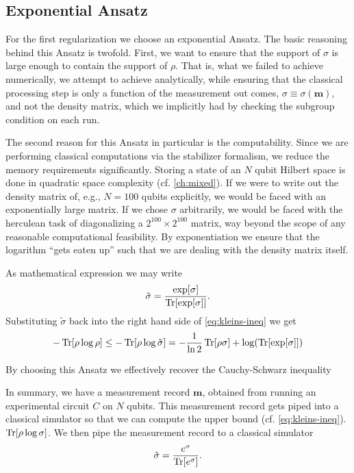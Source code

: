 \subsection{Exponential Ansatz}
For the first regularization we choose an exponential Ansatz. The basic reasoning
behind this Ansatz is twofold. First, we want to ensure that the support of
$\sigma$ is large enough to contain the support of $\rho$. That is, what we
failed to achieve numerically, we attempt to achieve analytically, while
ensuring that the classical processing step is only a function of the
measurement out comes, $\sigma \equiv \sigma(\mathbf{m})$, and not the density
matrix, which we implicitly had by checking the subgroup condition on each run.

The second reason for this Ansatz in particular is the computability. Since we
are performing classical computations via the stabilizer formalism, we reduce
the memory requirements significantly. Storing a state of an $N$ qubit Hilbert
space is done in quadratic space complexity (cf. \cref{ch:mixed}). If we were
to write out the density matrix of, e.g., $N=100$ qubits explicitly, we would
be faced with an exponentially large matrix. If we chose $\sigma$ arbitrarily,
we would be faced with the herculean task of diagonalizing a $2^{100} \times
2^{100}$ matrix, way beyond the scope of any reasonable computational
feasibility. By exponentiation we ensure that the logarithm \enquote{gets eaten
up} such that we are dealing with the density matrix itself. 

As mathematical expression we may write
\begin{align}
  \tilde{\sigma} = \frac{\exp[\sigma]}{\Tr[\exp[\sigma]]}
.\end{align}
Substituting $\tilde{\sigma}$ back into the right hand side of
\cref{eq:kleins-ineq} we get
\begin{align}
  -\Tr[\rho\log\rho]\leq-\Tr[\rho\log\tilde{\sigma}] = -\frac{1}{\ln 2}\Tr[\rho\sigma] +
  \log(\Tr[\exp[\sigma]])
\end{align}

By choosing this Ansatz we effectively recover the Cauchy-Schwarz inequality

In summary, we have a measurement record $\mathbf{m}$, obtained from running an
experimental circuit $C$ on $N$ qubits. This measurement record gets piped into
a classical simulator so that we can compute the upper bound (cf.
\cref{eq:kleins-ineq}). 
$\Tr[\rho\log\sigma]$. 
We then pipe the measurement record to a classical
simulator 
\begin{align}
  \tilde{\sigma} = \frac{e^\sigma}{\Tr[e^\sigma]}
.\end{align}

